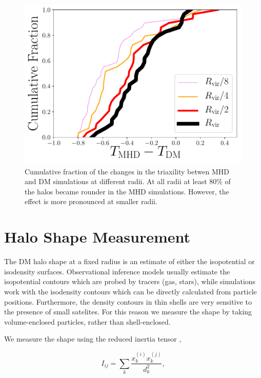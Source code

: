 \documentclass[a4paper,fleqn,usenatbib]{mnras}
\begin{document}
\begin{figure}
\includegraphics[width=0.9\columnwidth]{delta_triaxialiy_distro.pdf}
\caption{Cumulative fraction of the changes in the triaxility betwen
  MHD and DM simulations at different radii. 
  At all radii at least $80\%$ of the halos became rounder in the MHD
  simulations. 
  However, the effect is more pronounced at smaller radii.}
\label{fig:triax_difference}
\end{figure}

\section{Halo Shape Measurement}


The DM halo shape at a fixed radius is an estimate of either
the isopotential or isodensity surfaces.  
Observational inference models usually estimate the 
isopotential contours which are probed by tracers (gas, stars), while
simulations work with the isodensity contours which can be directly
calculated from particle positions.  
Furthermore, the density contours in thin shells are very sensitive to
the presence of small satelites.  
For this reason we measure the shape by taking
volume-enclosed particles, rather than shell-enclosed.  

We measure the shape using the reduced inertia tensor \citep{Allgood_et_al._2006}, 


\begin{equation}
I_{ij} = \sum_k \frac{x_k^{(i)}x_k^{(j)}}{d^2_k},
\label{eq:inertia}
\end{equation}
\end{document}
